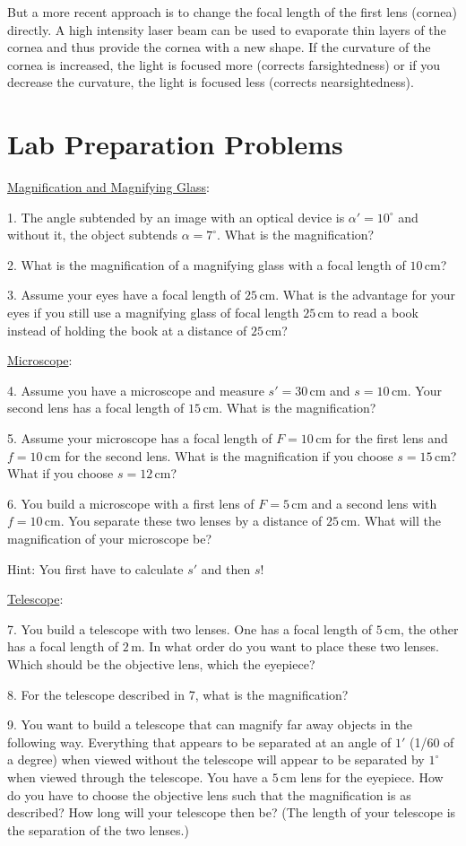 But a more recent approach is to change the focal length of the first lens (cornea) directly. A high intensity laser beam can be used to evaporate thin layers of the cornea and thus provide the cornea with a new shape. If the curvature of the cornea is increased, the light is focused more (corrects farsightedness) or if you decrease the curvature, the light is focused less (corrects nearsightedness).

\section{Lab Preparation Problems}
\noindent\underline{Magnification and Magnifying Glass}:\myskip

1. The angle subtended by an image with an optical device is $\alpha'= 10^\circ$ and without it, the object subtends $\alpha= 7^\circ$. What is the magnification?\myskip

2. What is the magnification of a magnifying glass with a focal length of $10\, \textrm{cm}$?\myskip

3. Assume your eyes have a focal length of $25\, \textrm{cm}$. What is the advantage for your eyes if you still use a magnifying glass of focal length $25\, \textrm{cm}$ to read a book instead of holding the book at a distance of $25\, \textrm{cm}$?\myskip

\noindent\underline{Microscope}:\myskip

4. Assume you have a microscope and measure $s' = 30\, \textrm{cm}$ and $s = 10\, \textrm{cm}$. Your second lens has a focal length of $15\, \textrm{cm}$. What is the magnification?\myskip

5. Assume your microscope has a focal length of $F = 10\, \textrm{cm}$ for the first lens and $f = 10\, \textrm{cm}$ for the second lens. What is the magnification if you choose $s = 15\, \textrm{cm}$? What if you choose $s = 12\, \textrm{cm}$?\myskip

6. You build a microscope with a first lens of $F = 5\, \textrm{cm}$ and a second lens with $f = 10\, \textrm{cm}$. You separate these two lenses by a distance of $25\, \textrm{cm}$. What will the magnification of your microscope be? \myskip

Hint: You first have to calculate $s'$ and then $s$!\myskip

\noindent\underline{Telescope}:\myskip

7. You build a telescope with two lenses. One has a focal length of $5\, \textrm{cm}$, the other has a focal length of $2\, \textrm{m}$. In what order do you want to place these two lenses. Which should be the objective lens, which the eyepiece? \myskip

8. For the telescope described in 7, what is the magnification?\myskip

9. You want to build a telescope that can magnify far away objects in the following way. Everything that appears to be separated at an angle of $1'$ (1/60 of a degree) when viewed without the telescope will appear to be separated by $1^\circ$ when viewed through the telescope. You have a $5\, \textrm{cm}$ lens for the eyepiece. How do you have to choose the objective lens such that the magnification is as described? How long will your telescope then be? (The length of your telescope is the separation of the two lenses.)
